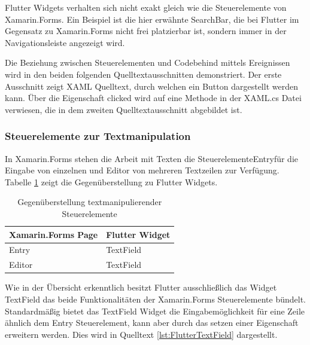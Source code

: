 Flutter Widgets verhalten sich nicht exakt gleich wie die Steuerelemente von Xamarin.Forms.  Ein Beispiel ist die hier erwähnte SearchBar, die bei Flutter im Gegensatz zu Xamarin.Forms nicht frei platzierbar ist, sondern immer in der Navigationsleiste angezeigt wird. 

Die Beziehung zwischen Steuerelementen und Codebehind mittels Ereignissen wird  in den beiden folgenden Quelltextausschnitten demonstriert.  Der erste Ausschnitt zeigt  XAML Quelltext,  durch welchen ein Button dargestellt werden kann.  Über die Eigenschaft clicked wird auf eine Methode in der XAML.cs Datei verwiesen,  die in dem zweiten Quelltextausschnitt abgebildet ist. 





\subsubsection{Steuerelemente zur Textmanipulation}
In Xamarin.Forms stehen die Arbeit mit Texten die Steuerelemente\glq Entry\grq{}für die Eingabe von einzelnen und  \glq Editor\grq{} von mehreren Textzeilen zur Verfügung.  Tabelle \ref{tab:TextWidgets} zeigt die Gegenüberstellung zu Flutter Widgets.  

\begin{table}[!ht]
\begin{tabularx}{\textwidth}{X|X}
   \textbf{Xamarin.Forms Page} & \textbf{Flutter Widget}  \\
\hline
	Entry		       		&  TextField	 		\\ 
	Editor		       	&  TextField	 		\\ 
\end{tabularx}
\caption{Gegenüberstellung textmanipulierender Steuerelemente}
 \label{tab:TextWidgets}
\end{table}
Wie in der Übersicht erkenntlich besitzt Flutter ausschließlich das Widget \glq TextField\grq{} das beide Funktionalitäten der Xamarin.Forms Steuerelemente bündelt.  Standardmäßig bietet das \glq TextField\grq{} Widget die Eingabemöglichkeit für eine Zeile ähnlich dem \glq Entry\grq{} Steuerelement, kann aber durch das setzen einer Eigenschaft erweitern werden.  Dies wird in Quelltext \ref{lst:FlutterTextField} dargestellt.

